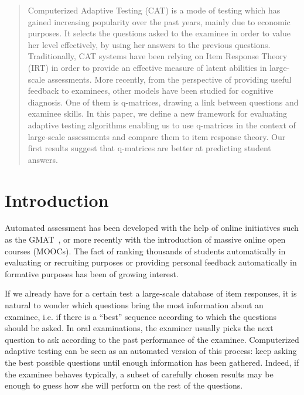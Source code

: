 \documentclass{sig-alternate}
\begin{document}
\maketitle
\begin{abstract}
Computerized Adaptive Testing (CAT) is a mode of testing which has gained increasing popularity over the past years, mainly due to economic purposes. It selects the questions asked to the examinee in order to value her level effectively, by using her answers to the previous questions.
Traditionally, CAT systems have been relying on Item Response Theory (IRT) in order to provide an effective measure of latent abilities in large-scale assessments.
More recently, from the perspective of providing useful feedback to examinees, other models have been studied for cognitive diagnosis. One of them is q-matrices, drawing a link between questions and examinee skills.
In this paper, we define a new framework for evaluating adaptive testing algorithms enabling us to use q-matrices in the context of large-scale assessments and compare them to item response theory.
Our first results suggest that q-matrices are better at predicting student answers.
\end{abstract}




\section{Introduction}
Automated assessment has been developed with the help of online initiatives such as the GMAT~\citep{Rudner2010}, or more recently with the introduction of massive online open courses (MOOCs). The fact of ranking thousands of students automatically in evaluating or recruiting purposes or providing personal feedback automatically in formative purposes has been of growing interest.

If we already have for a certain test a large-scale database of item responses, it is natural to wonder which questions bring the most information about an examinee, i.e. if there is a ``best'' sequence according to which the questions should be asked. In oral examinations, the examiner usually picks the next question to ask according to the past performance of the examinee. Computerized adaptive testing can be seen as an automated version of this process: keep asking the best possible questions until enough information has been gathered. Indeed, if the examinee behaves typically, a subset of carefully chosen results may be enough to guess how she will perform on the rest of the questions.
\end{document}
